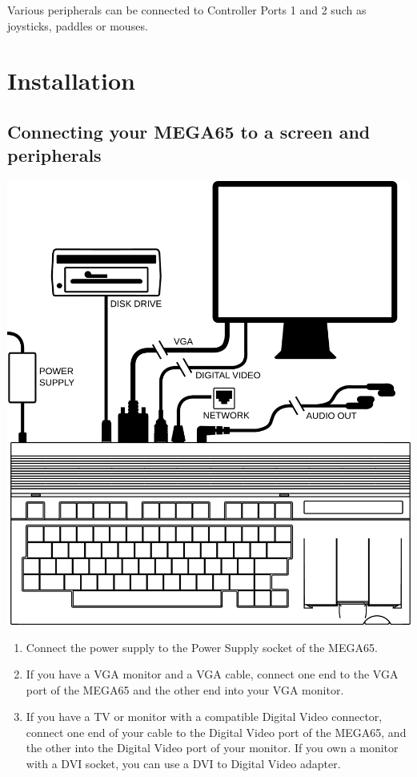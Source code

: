 Various peripherals can be connected to Controller Ports 1 and 2 such as joysticks, paddles or mouses.

\newpage

\section{Installation}

\subsection{Connecting your MEGA65 to a screen and peripherals}

\includegraphics[width=\linewidth]{images/illustrations/mega65-top.pdf}

\newpage

\begin{enumerate}
	\item Connect the power supply to the Power Supply socket of the MEGA65.
	\item If you have a VGA monitor and a VGA cable, connect one end to the VGA port of the MEGA65 and the other end into your VGA monitor.
	\item If you have a TV or monitor with a compatible Digital Video connector, connect one end of your cable to the Digital Video port of the MEGA65, and the other into the Digital Video port of your monitor. If you own a monitor with a DVI socket, you can use a DVI to Digital Video adapter.
\end{enumerate}

